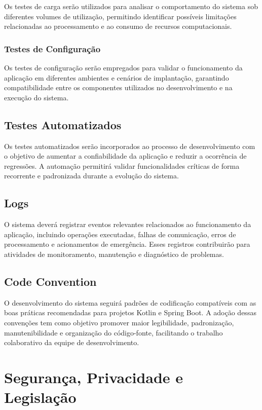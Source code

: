 Os testes de carga serão utilizados para analisar o comportamento do sistema sob diferentes volumes de utilização, permitindo identificar possíveis limitações relacionadas ao processamento e ao consumo de recursos computacionais.

\subsubsection{Testes de Configuração}

Os testes de configuração serão empregados para validar o funcionamento da aplicação em diferentes ambientes e cenários de implantação, garantindo compatibilidade entre os componentes utilizados no desenvolvimento e na execução do sistema.

\subsection{Testes Automatizados}

Os testes automatizados serão incorporados ao processo de desenvolvimento com o objetivo de aumentar a confiabilidade da aplicação e reduzir a ocorrência de regressões. A automação permitirá validar funcionalidades críticas de forma recorrente e padronizada durante a evolução do sistema.

\subsection{Logs}

O sistema deverá registrar eventos relevantes relacionados ao funcionamento da aplicação, incluindo operações executadas, falhas de comunicação, erros de processamento e acionamentos de emergência. Esses registros contribuirão para atividades de monitoramento, manutenção e diagnóstico de problemas.

\subsection{Code Convention}

O desenvolvimento do sistema seguirá padrões de codificação compatíveis com as boas práticas recomendadas para projetos Kotlin e Spring Boot. A adoção dessas convenções tem como objetivo promover maior legibilidade, padronização, manutenibilidade e organização do código-fonte, facilitando o trabalho colaborativo da equipe de desenvolvimento.

\section{Segurança, Privacidade e Legislação}

